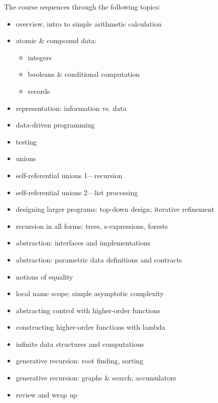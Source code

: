 \documentclass[11pt]{article}
\begin{document}
The course sequences through the following topics:
\begin{itemize}
\item overview, intro to simple arithmetic calculation
\item atomic \& compound data: 
  \begin{itemize}
    \item integers
    \item booleans \& conditional computation
    \item records
  \end{itemize}
\item representation: information vs. data
\item data-driven programming
\item testing
\item unions
\item self-referential unions 1---recursion
\item self-referential unions 2---list processing
\item designing larger programs: top-down design; iterative refinement
\item recursion in all forms: trees, s-expressions, forests
\item abstraction: interfaces and implementations
\item abstraction: parametric data definitions and contracts
\item notions of equality
\item local name scope; simple asymptotic complexity
\item abstracting control with higher-order functions
\item constructing higher-order functions with lambda
\item infinite data structures and computations
\item generative recursion: root finding, sorting
\item generative recursion: graphs \& search; accumulators
\item review and wrap up
\end{itemize}
\end{document}
